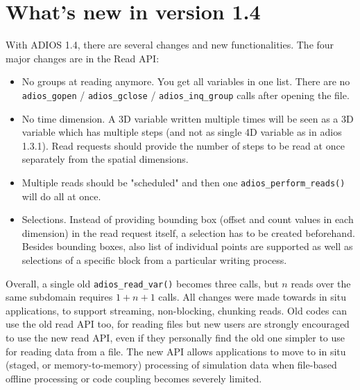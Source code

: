 %
%
\section {What's new in version 1.4}

With ADIOS 1.4, there are several changes and new functionalities.
The four major changes are in the Read API:

\begin{itemize}
\item No groups at reading anymore. You get all variables in one list.
There are no \verb+adios_gopen+ / \verb+adios_gclose+ / \verb+adios_inq_group+
calls after opening the file.
\item No time dimension. A 3D variable written multiple times will be seen as
a 3D variable which has multiple steps (and not as single 4D variable as in adios 1.3.1).
Read requests should provide the number of steps to be read at once separately from the
spatial dimensions.
\item Multiple reads should be "scheduled" and then one \verb+adios_perform_reads()+
will do all at once.
\item Selections. Instead of providing bounding box (offset and count values
in each dimension) in the read request itself, a selection has to be created
beforehand. Besides bounding boxes, also list of individual points are supported
as well as selections of a specific block from a particular writing process.
\end{itemize}

Overall, a single old \verb+adios_read_var()+ becomes three calls, but $n$ reads over the same subdomain requires $1+n+1$ calls.
All changes were made towards in situ applications, to support streaming, non-blocking, chunking reads.
Old codes can use the old read API too, for reading files but new users are strongly encouraged to use the new read API, even if they personally find the old one simpler to use for reading data from a file. The new API allows applications to move to in situ (staged, or memory-to-memory) processing of simulation data when file-based offline processing or code coupling becomes severely limited.

